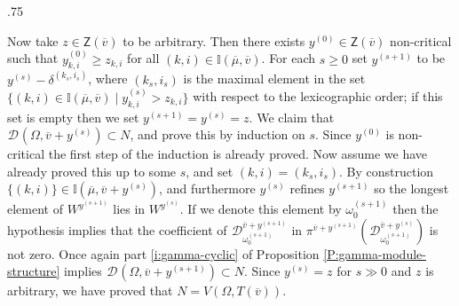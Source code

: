 \documentclass[11pt,fleqn]{amsart}
\makeatletter
\renewcommand\proofname{Proof}
\renewenvironment{proof}[1][\textit{\proofname}]{\par
 \pushQED{\qed}%
 \normalfont \topsep.75\paraskip\relax
 \trivlist
 \item[\hskip\labelsep
 \itshape
 #1\@addpunct{.}]\ignorespaces
}{%
 \popQED\endtrivlist\@endpefalse
}
\newcounter{para}[section]
\newcommand\II{\mathbb I}
\newcommand\DD[3]{{}^{#1} \mathcal D_{#2}^{#3}}
\newcommand\Z{\mathsf Z}
\newcommand\vv{\overline{v}}
\makeatother
\begin{document}
\begin{proof}
Now take $z \in \Z(\vv)$ to be arbitrary. Then there exists $y^{(0)} \in 
\Z(\vv)$ non-critical such that $y^{(0)}_{k,i} \geq z_{k,i}$ for all $(k,i)
\in \II(\overline \mu, \vv)$. For each $s \geq 0$ set $y^{(s+1)}$ to be 
$y^{(s)} - \delta^{(k_s, i_s)}$, where $(k_s, i_s)$ is the maximal element
in the set $\{(k,i) \in \II(\overline \mu, \vv) \mid y^{(s)}_{k,i} > z_{k,i}\}$
with respect to the lexicographic order; if this set is empty then we set 
$y^{(s+1)} = y^{(s)} = z$. We claim that $\DD{}{}{}(\Omega, \vv + y^{(s)}) 
\subset N$, and prove this by induction on $s$. Since $y^{(0)}$ is non-critical
the first step of the induction is already proved. Now assume we have already
proved this up to some $s$, and set $(k,i) = (k_s, i_s)$. By construction
$\{(k,i)\} \in \II(\overline \mu, \vv + y^{(s)})$, and furthermore $y^{(s)}$
refines $y^{(s+1)}$ so the longest element of $W^{y^{(s+1)}}$ lies in 
$W^{y^(s)}$. If we denote this element by $\omega_0^{(s+1)}$ then the 
hypothesis implies that the coefficient of $\DD{}{\omega_0^{(s+1)}}{\vv + 
y^{(s+1)}}$ in $\pi^{\vv + y^{(s+1)}}(\DD{}{\omega_0^{(s+1)}}{\vv + y^{(s)}})$
is not zero. Once again part \ref{i:gamma-cyclic} of Proposition
\ref{P:gamma-module-structure} implies $\DD{}{}{}(\Omega, \vv + y^{(s+1)}) 
\subset N$. Since $y^{(s)} = z$ for $s \gg 0$ and $z$ is arbitrary, we have
proved that $N = V(\Omega, T(\vv))$.
\end{proof}
\end{document}
